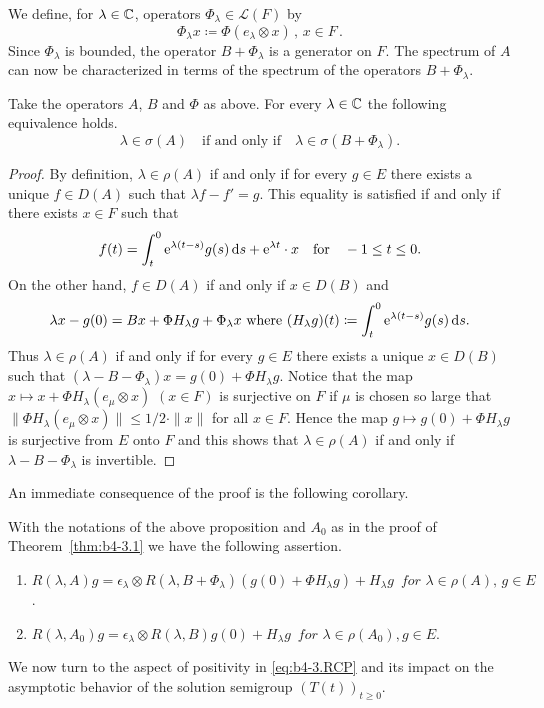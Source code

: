 We define, for $\lambda \in \mathbb{C}$, operators $\Phi_\lambda \in \mathcal{L}(F)$ by
\begin{equation}\label{eq:b4-3.3}
	\Phi_\lambda x  \coloneq  \Phi(e_\lambda \otimes x) \, , \, x \in F \, .
\end{equation}
Since $\Phi_\lambda$ is bounded, the operator $B + \Phi_\lambda$ is a generator on $F$. 
The spectrum of\/ $A$ can now be characterized in terms of the spectrum of the operators $B + \Phi_\lambda$.
\begin{proposition}\label{prop:b4-3.4}
	Take the operators $A$, $B$ and $\Phi$ as above. 
    For every $\lambda \in \mathbb{C}$ the following equivalence holds. 
	\begin{equation}\label{eq:b4-3.4}
		\lambda \in \sigma(A) \quad \text{if and only if} \quad \lambda \in \sigma(B + \Phi_\lambda).
	\end{equation}
\end{proposition}
\begin{proof} By definition, $\lambda \in \rho(A)$ if and only if for every $g \in E$ there exists a unique $f \in D(A)$ such that $\lambda f - f' = g$. 
This equality is satisfied if and only if there exists $x \in F$ such that
\[
f(t) = \int_t^0 \eu^{\lambda(t-s)} g(s)  \ds  + \eu^{\lambda t} \cdot x \quad \text{for} \quad -1 \leq t \leq 0   .
\]
On the other hand, $f \in D(A)$ if and only if\/ $x \in D(B)$ and
\[
\text{$\lambda x - g(0) = Bx + \Phi H_\lambda g + \Phi_\lambda x$ where $(H_\lambda g)(t) \coloneq  \int_t^0 \mathrm{e}^{\lambda(t-s)} g(s)  \mathop{}\!\mathrm{d}{s}  .$}
\]
Thus $\lambda \in \rho(A)$ if and only if for every $g \in E$ there exists a unique $x \in D(B)$ such that $(\lambda - B - \Phi_\lambda)x = g(0) + \Phi H_\lambda g$. 
Notice that the map $x \mapsto x + \Phi H_\lambda(e_\mu \otimes x)$ $(x \in F)$ is surjective on $F$ if\/ $\mu$ is chosen so large that $\|\Phi H_\lambda(e_\mu \otimes x)\| \leq 1/2 \cdot \|x\|$ for all $x \in F$. 
Hence the map $g \mapsto g(0) + \Phi H_\lambda g$ is surjective from $E$ onto $F$ and this shows that $\lambda \in \rho(A)$ if and only if\/ $\lambda - B - \Phi_\lambda$ is invertible.
\end{proof}
An immediate consequence of the proof is the following corollary.
\begin{corollary*}
With the notations of the above proposition and $A_{0}$ as in the proof of Theorem~\ref{thm:b4-3.1} we have the following assertion.
\begin{enumerate}[\upshape (i)]
	\item  
	$R(\lambda,A)g = \epsilon_\lambda \otimes R(\lambda,B+\Phi_\lambda)(g(0)+\Phi H_\lambda g) + H_\lambda g \,\textit{ for } \lambda \in \rho(A) , \,g \in E$.

	\item 
	$R(\lambda,A_{0})g = \epsilon_\lambda \otimes R(\lambda,B)g(0) + H_\lambda g\, \textit{ for }  \lambda \in \rho(A_{0}) , g \in E$.
\end{enumerate}
\end{corollary*}
We now turn to the aspect of positivity in \eqref{eq:b4-3.RCP} and its impact on the asymptotic behavior of the solution semigroup $(T(t))_{t \geq 0}$. 

